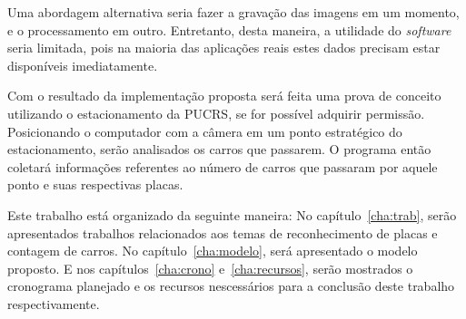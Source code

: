 Uma abordagem alternativa seria fazer a gravação das imagens em um momento, e o
processamento em outro. Entretanto, desta maneira, a utilidade do
\emph{software} seria limitada, pois na maioria das aplicações reais estes dados
precisam estar disponíveis imediatamente.

Com o resultado da implementação proposta será feita uma prova de conceito
utilizando o estacionamento da PUCRS, se for possível adquirir permissão.
Posicionando o computador com a câmera em um ponto estratégico do
estacionamento, serão analisados os carros que passarem. O programa então
coletará informações referentes ao número de carros que passaram por aquele ponto
e suas respectivas placas.

Este trabalho está organizado da seguinte maneira: No capítulo~\ref{cha:trab},
serão apresentados trabalhos relacionados aos temas de reconhecimento de placas
e contagem de carros. No capítulo~\ref{cha:modelo}, será apresentado o modelo
proposto. E nos capítulos~\ref{cha:crono}  e~\ref{cha:recursos}, serão mostrados
o cronograma planejado e os recursos nescessários para a conclusão deste
trabalho respectivamente.

